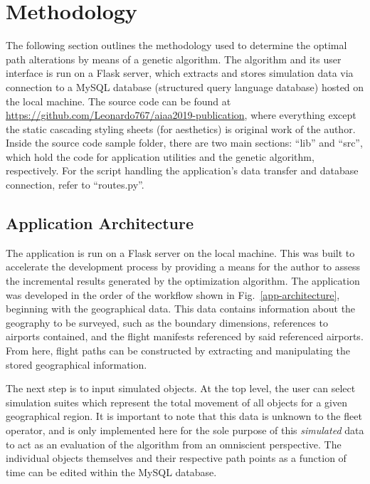\documentclass[conf]{new-aiaa}
\begin{document}
\section{Methodology}

The following section outlines the methodology used to determine the optimal path alterations by means of a genetic algorithm. The algorithm and its user interface is run on a Flask server, which extracts and stores simulation data via connection to a MySQL database (structured query language database) hosted on the local machine. The source code can be found at \url{https://github.com/Leonardo767/aiaa2019-publication}, where everything except the static cascading styling sheets (for aesthetics) is original work of the author. Inside the source code sample folder, there are two main sections: ``lib'' and ``src'', which hold the code for application utilities and the genetic algorithm, respectively. For the script handling the application's data transfer and database connection, refer to ``routes.py''.


\subsection{Application Architecture}
The application is run on a Flask server on the local machine. This was built to accelerate the development process by providing a means for the author to assess the incremental results generated by the optimization algorithm. The application was developed in the order of the workflow shown in Fig.~\ref{app-architecture}, beginning with the geographical data. This data contains information about the geography to be surveyed, such as the boundary dimensions, references to airports contained, and the  flight manifests referenced by said referenced airports. From here, flight paths can be constructed by extracting and manipulating the stored geographical information.

The next step is to input simulated objects. At the top level, the user can select simulation suites which represent the total movement of all objects for a given geographical region. It is important to note that this data is unknown to the fleet operator, and is only implemented here for the sole purpose of this \emph{simulated} data to act as an evaluation of the algorithm from an omniscient perspective. The individual objects themselves and their respective path points as a function of time can be edited within the MySQL database.
\end{document}
